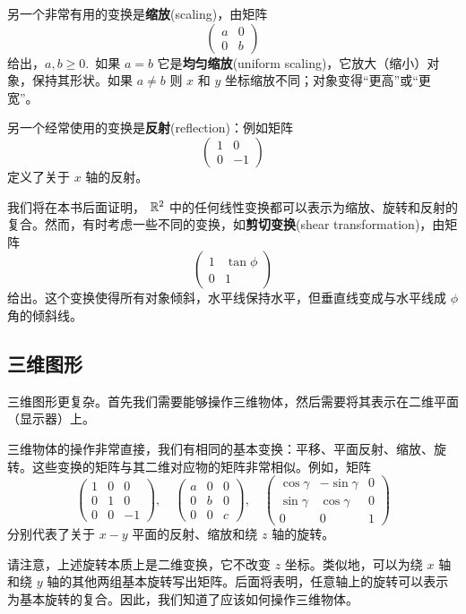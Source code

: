 另一个非常有用的变换是\textbf{缩放}(scaling)，由矩阵
$$\begin{pmatrix} a & 0 \\ 0 & b \end{pmatrix}$$
给出，$a, b \ge 0$.~如果 $a=b$ 它是\textbf{均匀缩放}(uniform scaling)，它放大（缩小）对象，保持其形状。如果 $a \neq b$ 则 $x$ 和 $y$ 坐标缩放不同；对象变得“更高”或“更宽”。

另一个经常使用的变换是\textbf{反射}(reflection)：例如矩阵
$$\begin{pmatrix} 1 & 0 \\ 0 & -1 \end{pmatrix}$$
定义了关于 $x$ 轴的反射。

我们将在本书后面证明， $\mathbb{R}^2$ 中的任何线性变换都可以表示为缩放、旋转和反射的复合。然而，有时考虑一些不同的变换，如\textbf{剪切变换}(shear transformation)，由矩阵
$$\begin{pmatrix} 1 & \tan \phi \\ 0 & 1 \end{pmatrix}$$
给出。这个变换使得所有对象倾斜，水平线保持水平，但垂直线变成与水平线成 $\phi$ 角的倾斜线。

\subsection{三维图形}\label{sec:01-08-02}

三维图形更复杂。首先我们需要能够操作三维物体，然后需要将其表示在二维平面（显示器）上。

三维物体的操作非常直接，我们有相同的基本变换：平移、平面反射、缩放、旋转。这些变换的矩阵与其二维对应物的矩阵非常相似。例如，矩阵
$$
\begin{pmatrix} 1 & 0 & 0 \\ 0 & 1 & 0 \\ 0 & 0 & -1 \end{pmatrix}, \quad \begin{pmatrix} a & 0 & 0 \\ 0 & b & 0 \\ 0 & 0 & c \end{pmatrix}, \quad \begin{pmatrix} \cos \gamma & -\sin \gamma & 0 \\ \sin \gamma & \cos \gamma & 0 \\ 0 & 0 & 1 \end{pmatrix}
$$
分别代表了关于 $x-y$ 平面的反射、缩放和绕 $z$ 轴的旋转。

请注意，上述旋转本质上是二维变换，它不改变 $z$ 坐标。类似地，可以为绕 $x$ 轴和绕 $y$ 轴的其他两组基本旋转写出矩阵。后面将表明，任意轴上的旋转可以表示为基本旋转的复合。因此，我们知道了应该如何操作三维物体。


